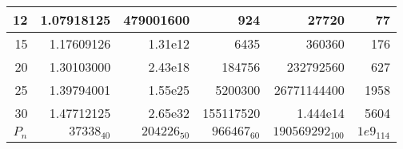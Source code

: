 \begin{center}
\begin{tabular}{|r|r|r|r|r|r|}
        12          & 1.07918125    & 479001600     & 924           & 27720                 & 77            \\ \hline 
        15          & 1.17609126    & 1.31e12       & 6435          & 360360                & 176           \\ \hline 
        20          & 1.30103000    & 2.43e18       & 184756        & 232792560             & 627           \\ \hline 
        25          & 1.39794001    & 1.55e25       & 5200300       & 26771144400           & 1958          \\ \hline 
        30          & 1.47712125    & 2.65e32       & 155117520     & 1.444e14              & 5604          \\ \hline 
        $P_n$       & $37338_{40}$  & $204226_{50}$ & $966467_{60}$ & $190569292_{100}$     & $1e9_{114}$   \\ \hline 
    \end{tabular}\\
\end{center}
